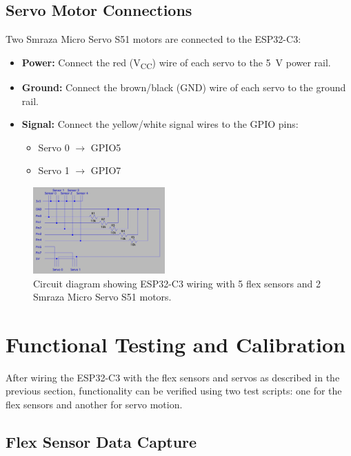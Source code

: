 \documentclass[conference]{IEEEtran}
\begin{document}
\subsection{Servo Motor Connections}

Two Smraza Micro Servo S51 motors are connected to the ESP32-C3:

\begin{itemize}
    \item \textbf{Power:} Connect the red (V\textsubscript{CC}) wire of each servo to the 5~V power rail.
    \item \textbf{Ground:} Connect the brown/black (GND) wire of each servo to the ground rail.
    \item \textbf{Signal:} Connect the yellow/white signal wires to the GPIO pins:
    \begin{itemize}
        \item Servo 0 $\rightarrow$ GPIO5
        \item Servo 1 $\rightarrow$ GPIO7
    \end{itemize}
\end{itemize}

\begin{figure}[!ht]
    \centering
    \includegraphics[width=0.45\textwidth]{proto1.jpeg}
    \caption{Circuit diagram showing ESP32-C3 wiring with 5 flex sensors and 2 Smraza Micro Servo S51 motors.}
    \label{fig:circuit}
\end{figure}

\section{Functional Testing and Calibration}

After wiring the ESP32-C3 with the flex sensors and servos as described in the previous section, functionality can be verified using two test scripts: one for the flex sensors and another for servo motion.

\subsection{Flex Sensor Data Capture}
\end{document}
